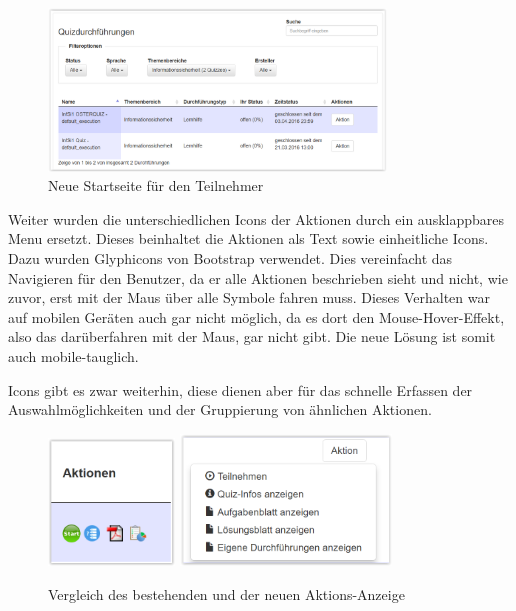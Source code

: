 \begin{figure}[H]
	\centering
	\includegraphics[width=0.8\textwidth]{Images/Startseite_neu.PNG}
	\caption{Neue Startseite für den Teilnehmer}
\end{figure}


Weiter wurden die unterschiedlichen Icons der Aktionen durch ein ausklappbares Menu ersetzt. Dieses beinhaltet die Aktionen als Text sowie einheitliche Icons. Dazu wurden Glyphicons von Bootstrap \cite{glyphicons} verwendet. Dies vereinfacht das Navigieren für den Benutzer, da er alle Aktionen beschrieben sieht und nicht, wie zuvor, erst mit der Maus über alle Symbole fahren muss. Dieses Verhalten war auf mobilen Geräten auch gar nicht möglich, da es dort den \glqq Mouse-Hover-Effekt\grqq, also das darüberfahren mit der Maus, gar nicht gibt. Die neue Lösung ist somit auch mobile-tauglich.

Icons gibt es zwar weiterhin, diese dienen aber für das schnelle Erfassen der Auswahlmöglichkeiten und der Gruppierung von ähnlichen Aktionen.


\begin{figure}[H]
	\centering
	\includegraphics[width=0.3\textwidth]{Images/Aktionen_alt.PNG}
	\includegraphics[width=0.5\textwidth]{Images/Aktionen_neu.PNG}
	\caption{Vergleich des bestehenden und der neuen Aktions-Anzeige}
	\cite{mobilequiz.ch}
\end{figure}







